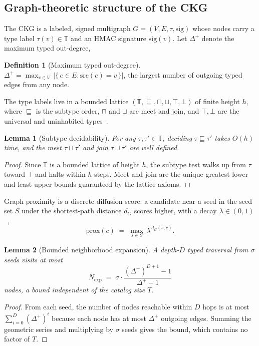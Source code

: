 \documentclass[11pt]{article}
\theoremstyle{plain}
\newtheorem{lemma}{Lemma}
\theoremstyle{definition}
\newtheorem{definition}{Definition}
\begin{document}
\subsection{Graph-theoretic structure of the CKG}
\label{sec:graph}
The CKG is a labeled, signed multigraph $G=(V,E,\tau,\mathrm{sig})$ whose nodes
carry a type label $\tau(v)\in\mathbb{T}$ and an HMAC signature $\mathrm{sig}(v)$.
Let $\Delta^{+}$ denote the maximum typed out-degree,
\begin{definition}[Maximum typed out-degree]
$\Delta^{+} = \max_{v\in V}\,\big|\{\,e\in E : \mathrm{src}(e)=v\,\}\big|$, the
largest number of outgoing typed edges from any node.
\end{definition}
The type labels live in a bounded lattice $(\mathbb{T},\sqsubseteq,\sqcap,\sqcup,
\top,\bot)$ of finite height $h$, where $\sqsubseteq$ is the subtype order,
$\sqcap$ and $\sqcup$ are meet and join, and $\top,\bot$ are the universal and
uninhabited types~\citep{davey2002lattices}.

\begin{lemma}[Subtype decidability]
\label{lem:subtype}
For any $\tau,\tau'\in\mathbb{T}$, deciding $\tau\sqsubseteq\tau'$ takes $O(h)$
time, and the meet $\tau\sqcap\tau'$ and join $\tau\sqcup\tau'$ are well defined.
\end{lemma}
\begin{proof}
Since $\mathbb{T}$ is a bounded lattice of height $h$, the subtype test walks up
from $\tau$ toward $\top$ and halts within $h$ steps. Meet and join are the
unique greatest lower and least upper bounds guaranteed by the lattice axioms.
\end{proof}

Graph proximity is a discrete diffusion score: a candidate near a seed in the
seed set $S$ under the shortest-path distance $d_G$ scores higher, with a decay
$\lambda\in(0,1)$~\citep{page1999pagerank,kondor2002diffusion},
\begin{equation}
\label{eq:prox}
\mathrm{prox}(c) \;=\; \max_{s\in S}\, \lambda^{\,d_G(s,c)} .
\end{equation}

\begin{lemma}[Bounded neighborhood expansion]
\label{lem:expand}
A depth-$D$ typed traversal from $\sigma$ seeds visits at most
\begin{equation}
\label{eq:expand}
N_{\exp} \;=\; \sigma \cdot \frac{(\Delta^{+})^{D+1}-1}{\Delta^{+}-1}
\end{equation}
nodes, a bound independent of the catalog size $T$.
\end{lemma}
\begin{proof}
From each seed, the number of nodes reachable within $D$ hops is at most
$\sum_{i=0}^{D}(\Delta^{+})^{i}$ because each node has at most $\Delta^{+}$
outgoing edges. Summing the geometric series and multiplying by $\sigma$ seeds
gives the bound, which contains no factor of $T$.
\end{proof}
\end{document}
